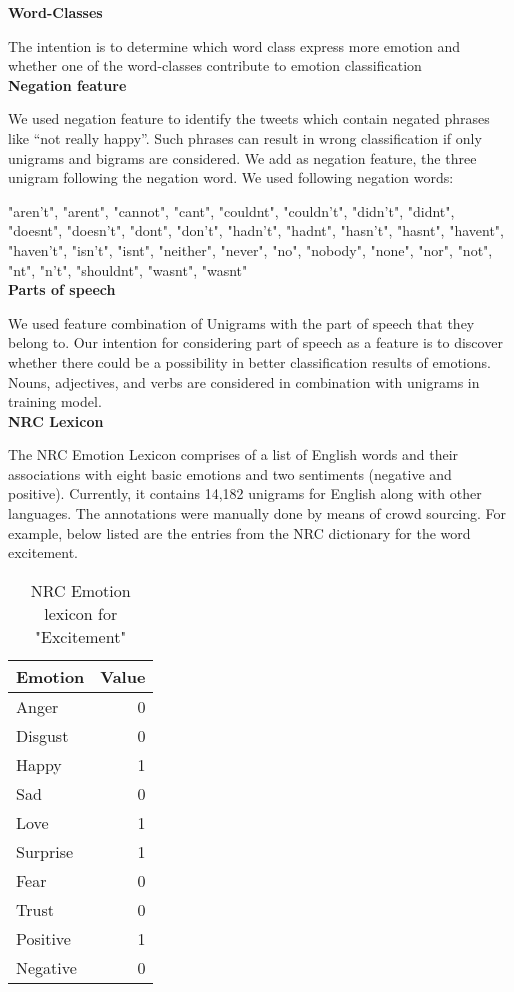 \documentclass[11pt]{article}
\begin{document}
{  
  {\bf Word-Classes}
  
  
  The intention is to determine which word class express more emotion and whether one of the word-classes contribute to emotion classification\\
  
  
  {\bf Negation feature}
  
  
  We used negation feature to identify the tweets which contain negated phrases like “not really happy”. Such phrases can result in wrong
  classification if only unigrams and bigrams are considered. We add as negation feature, the three unigram following the negation word. We used
  following negation words:
  
  "aren’t", "arent", "cannot", "cant", "couldnt", "couldn’t", "didn’t", "didnt", "doesnt", "doesn’t", "dont", "don’t", "hadn’t", "hadnt", "hasn’t",
  "hasnt", "havent", "haven’t", "isn’t", "isnt", "neither", "never", "no", "nobody", "none", "nor", "not", "nt", "n’t", "shouldnt", "wasnt", "wasnt"\\
  
  {\bf Parts of speech}
  
  
  We used feature combination of Unigrams with the part of speech that they belong to. Our intention for considering part of speech as a feature is to discover whether there could be a possibility in better classification results of emotions. Nouns, adjectives, and verbs are considered in combination with unigrams in training model. \\
  
  {\bf NRC Lexicon}
  
  The NRC Emotion Lexicon comprises of a list of English words and their associations with eight basic emotions and two sentiments (negative and positive). Currently, it contains 14,182 unigrams for English along with other languages. The annotations were manually done by means of crowd sourcing. For example, below listed are the entries from the NRC dictionary for the word excitement.\\
  
  \begin{table}[h]
  \begin{center}
  \begin{tabular}{|l|r|}
  \hline \bf Emotion & \bf Value\\ \hline
  Anger & 0\\
  Disgust & 0\\
  Happy & 1\\
  Sad & 0\\
  Love & 1\\
  Surprise & 1\\
  Fear & 0\\
  Trust & 0\\
  Positive & 1\\
  Negative & 0\\
  \hline
  \end{tabular}
  \end{center}
  \caption{\label{font-table} NRC Emotion lexicon for "Excitement"}
  \end{table}
  
}
\end{document}
